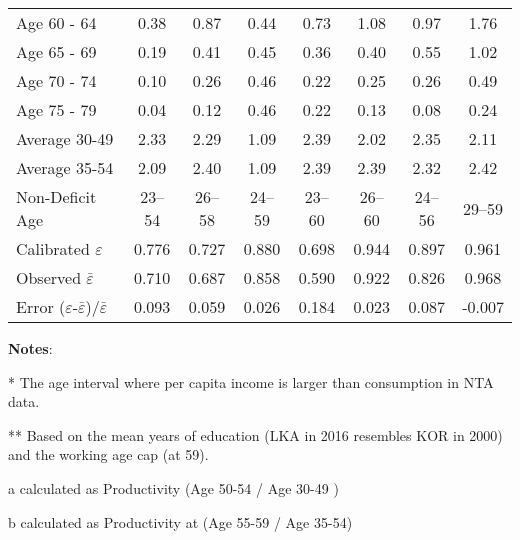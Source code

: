 \documentclass[preprint,12pt,authoryear]{elsarticle}
\begin{document}
\begin{table}[H]
\begin{threeparttable}
\begin{tabular}{ l c c c c c c c  }
				Age 60 - 64                                                   & 0.38           & 0.87           & 0.44             & 0.73           & 1.08           & 0.97           & 1.76           \\
				Age 65 - 69                                                   & 0.19           & 0.41           & 0.45             & 0.36           & 0.40           & 0.55           & 1.02           \\
				Age 70 - 74                                                   & 0.10           & 0.26           & 0.46             & 0.22           & 0.25           & 0.26           & 0.49           \\
				Age 75 - 79                                                   & 0.04           & 0.12           & 0.46             & 0.22           & 0.13           & 0.08           & 0.24           \\
				\midrule
				Average 30-49                                                 & 2.33           & 2.29           & 1.09             & 2.39           & 2.02           & 2.35           & 2.11           \\
				Average 35-54                                                 & 2.09           & 2.40           & 1.09             & 2.39           & 2.39           & 2.32           & 2.42           \\
				Non-Deficit Age\tnote{*}                                      & 23--54         & 26--58         & 24--59\tnote{**} & 23--60         & 26--60         & 24--56         & 29--59         \\
				\midrule
				Calibrated $\varepsilon$                                      & 0.776          & 0.727          & 0.880            & 0.698          & 0.944          & 0.897          & 0.961          \\
				Observed $\bar{\varepsilon}$                                  & 0.710\tnote{a} & 0.687\tnote{b} & 0.858\tnote{b}   & 0.590\tnote{b} & 0.922\tnote{b} & 0.826\tnote{a} & 0.968\tnote{b} \\
				Error ($\varepsilon$-$\bar{\varepsilon}$)/$\bar{\varepsilon}$ & 0.093          & 0.059          & 0.026            & 0.184          & 0.023          & 0.087          & -0.007         \\
				\bottomrule
			\end{tabular}
			\begin{tablenotes}
				\tiny 
				\item \textbf{Notes}:  
				\item[*] The age interval where per capita income is larger than consumption in NTA data.
				\item [**] Based on the mean years of education (LKA in 2016 resembles KOR in 2000) and the working age cap (at 59).
				\item [a] calculated as Productivity (Age 50-54 / Age 30-49 )
				\item [b] calculated as Productivity at (Age 55-59 / Age 35-54)
			\end{tablenotes}
		\end{threeparttable}
	\end{table}
	
	
	
	\newpage
	
		
		
	
	\printendnotes
	
\end{document}
